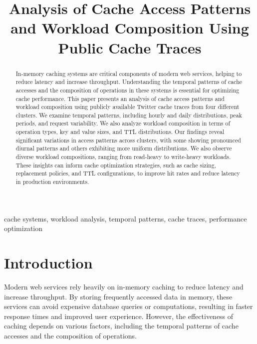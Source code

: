 \documentclass[conference]{IEEEtran}
\begin{document}
\title{Analysis of Cache Access Patterns and Workload Composition Using Public Cache Traces}

\author{
}

\maketitle

\begin{abstract}
In-memory caching systems are critical components of modern web services, helping to reduce latency and increase throughput. Understanding the temporal patterns of cache accesses and the composition of operations in these systems is essential for optimizing cache performance. This paper presents an analysis of cache access patterns and workload composition using publicly available Twitter cache traces from four different clusters. We examine temporal patterns, including hourly and daily distributions, peak periods, and request variability. We also analyze workload composition in terms of operation types, key and value sizes, and TTL distributions. Our findings reveal significant variations in access patterns across clusters, with some showing pronounced diurnal patterns and others exhibiting more uniform distributions. We also observe diverse workload compositions, ranging from read-heavy to write-heavy workloads. These insights can inform cache optimization strategies, such as cache sizing, replacement policies, and TTL configurations, to improve hit rates and reduce latency in production environments.
\end{abstract}

\begin{IEEEkeywords}
cache systems, workload analysis, temporal patterns, cache traces, performance optimization
\end{IEEEkeywords}

\section{Introduction}
Modern web services rely heavily on in-memory caching to reduce latency and increase throughput. By storing frequently accessed data in memory, these services can avoid expensive database queries or computations, resulting in faster response times and improved user experience. However, the effectiveness of caching depends on various factors, including the temporal patterns of cache accesses and the composition of operations.
\end{document}

